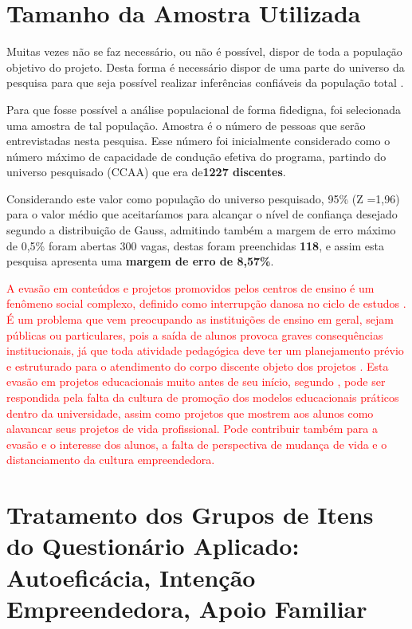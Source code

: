 \section{Tamanho da Amostra Utilizada}

Muitas vezes não se faz necessário, ou não é possível, dispor de toda a população objetivo do projeto. Desta forma é necessário dispor de uma parte do universo da pesquisa para que seja possível realizar inferências confiáveis da população total \cite{marino_manual_2003}.

Para que fosse possível a análise populacional de forma fidedigna, foi selecionada uma amostra de tal população. Amostra é o número de pessoas que serão entrevistadas nesta pesquisa. Esse número foi inicialmente considerado como o número máximo de capacidade de condução efetiva do programa, partindo do universo pesquisado (CCAA) que era de\textbf{1227 discentes}.


Considerando este valor como população do universo pesquisado, 95\% (Z =1,96) para o valor médio que aceitaríamos para alcançar o nível de confiança desejado segundo a distribuição de Gauss, admitindo também a margem de erro máximo de 0,5\% foram abertas 300 vagas, destas foram preenchidas \textbf{118}, e assim esta pesquisa apresenta uma \textbf{margem de erro de 8,57\%}.

\textcolor{red}{A evasão em conteúdos e projetos promovidos pelos centros de ensino é um fenômeno social complexo, definido como interrupção danosa no ciclo de estudos \cite{santos_baggi_dropout_2011}. É um problema que vem preocupando as instituições de ensino em geral, sejam públicas ou particulares, pois a saída de alunos provoca graves consequências institucionais, já que toda atividade pedagógica deve ter um planejamento prévio e estruturado para o atendimento do corpo discente objeto dos projetos \cite{figueiredo_educacao_2017}. Esta evasão em projetos educacionais muito antes de seu início, segundo , pode ser respondida pela falta da cultura de promoção dos modelos educacionais práticos dentro da universidade, assim como projetos que mostrem aos alunos como alavancar seus projetos de vida profissional. Pode contribuir também para a evasão e o interesse dos alunos, a falta de perspectiva de mudança de vida e o distanciamento da cultura empreendedora.
}

\section{Tratamento dos Grupos de Itens do Questionário Aplicado: Autoeficácia, Intenção Empreendedora, Apoio Familiar}

